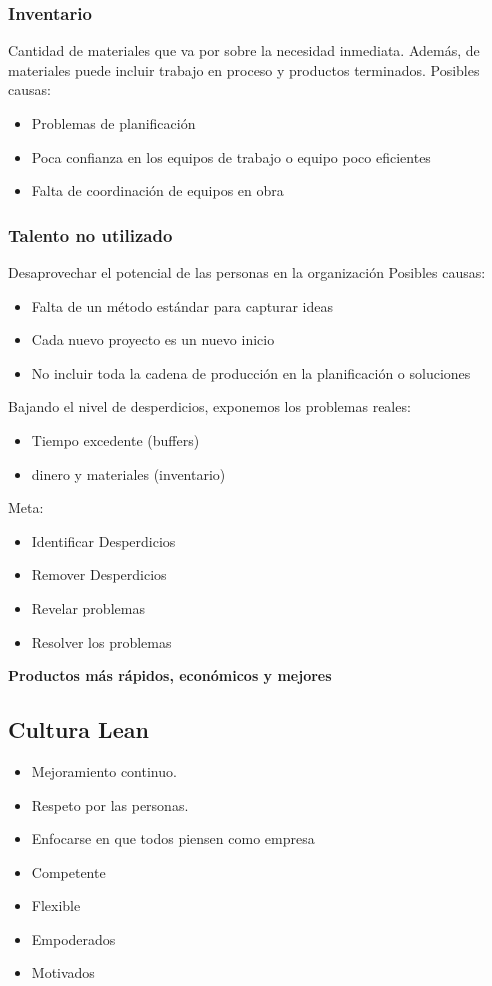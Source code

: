 \subsubsection*{Inventario}
Cantidad de materiales que va por sobre la necesidad inmediata. Además, de materiales puede incluir trabajo en proceso y productos terminados.
Posibles causas:
\begin{itemize}
    \item Problemas de planificación
    \item Poca confianza en los equipos de trabajo o equipo poco eficientes
    \item Falta de coordinación de equipos en obra
\end{itemize}


\subsubsection*{Talento no utilizado}
Desaprovechar el potencial de las personas en la organización
Posibles causas:
\begin{itemize}
    \item Falta de un método estándar para capturar ideas
    \item Cada nuevo proyecto es un nuevo inicio
    \item No incluir toda la cadena de producción en la planificación o soluciones
\end{itemize}

Bajando el nivel de desperdicios, exponemos los problemas reales: 
\begin{itemize}
    \item Tiempo excedente (buffers)
    \item dinero y materiales (inventario)
\end{itemize}

Meta:
\begin{itemize}
    \item Identificar Desperdicios
    \item Remover Desperdicios
    \item Revelar problemas
    \item Resolver los problemas
\end{itemize}

\textbf{Productos más rápidos, económicos y mejores}

\subsection{Cultura Lean}
\begin{itemize}
    \item Mejoramiento continuo.
    \item Respeto por las personas.
    \item Enfocarse en que todos piensen como empresa
    \item Competente
    \item Flexible
    \item Empoderados
    \item Motivados
\end{itemize}

